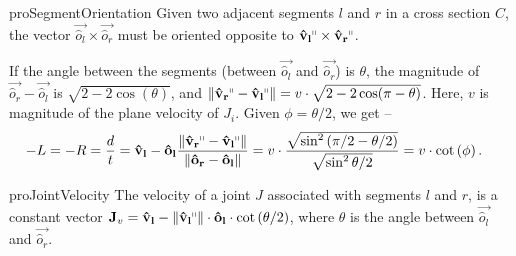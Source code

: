 \begin{restatable}{pro}{SegmentOrientation}
\label{pro:SegmentOrientation}
Given two adjacent segments $l$ and $r$ in a cross section $C$, the vector
$\vec{\hat o_l}\times \vec{\hat o_r}$ must be oriented opposite to $\vec{\hat v_l}^\shortparallel\times \vec{\hat v_r}^\shortparallel$.
\end{restatable}

If the angle between the segments (between $\vec{\hat o_l}$ and $\vec{\hat o_r}$) is $\theta$,
the magnitude of $\vec{\hat o_r}-\vec{\hat o_l}$ is $\sqrt{2-2\cos(\theta)}$,
and $ \left\| \vec{\hat v_r}^\shortparallel-\vec{\hat v_l}^\shortparallel\right\| = v\cdot\sqrt{2-2\cos(\pi-\theta)}$.
Here, $v$ is magnitude of the plane velocity of $J_i$. Given $\phi = \theta/2$, we get --
\begin{align*}
-L = -R &= \frac dt = \vec{\hat v_l} - \vec{\hat o_l}\frac{ \left\| \vec{\hat v_r}^\shortparallel
- \vec{\hat v_l}^\shortparallel\right\|}{ \left\| \vec{\hat o_r}-\vec{\hat o_l}\right\|}
= v\cdot\frac{\sqrt{\sin^2\left( {\pi/2-\theta/2}\right)}}{\sqrt{\sin^2{\theta/2}}}
= v\cdot\cot\left( \phi \right).
\end{align*}

\begin{restatable}{pro}{JointVelocity}
\label{pro:joint_velocity}
The velocity of a joint $J$ associated with segments $l$ and $r$, is a constant vector
$\vec J_v
= \vec{\hat v_l} - \left\| \vec{\hat v_l}^\shortparallel\right\|\cdot\vec{\hat o_l}\cdot\cot\left( \theta/2 \right)$,
where $\theta$ is the angle between $\vec{\hat o_l}$ and $\vec{\hat o_r}$.
\end{restatable}

